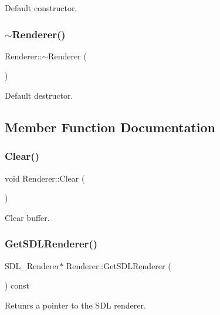 Default constructor. \mbox{\label{class_renderer_afeee408862d5bd6255a6882d47e6d5cd}} 
\subsubsection{\texorpdfstring{$\sim$\+Renderer()}{~Renderer()}}
{\footnotesize\ttfamily Renderer\+::$\sim$\+Renderer (\begin{DoxyParamCaption}{ }\end{DoxyParamCaption})}

Default destructor. 

\subsection{Member Function Documentation}
\mbox{\label{class_renderer_aeedbc2ffdccf51fa1384100446488746}} 
\subsubsection{\texorpdfstring{Clear()}{Clear()}}
{\footnotesize\ttfamily void Renderer\+::\+Clear (\begin{DoxyParamCaption}{ }\end{DoxyParamCaption})}

Clear buffer. \mbox{\label{class_renderer_a10f0554599d4fde891984d41d0e45c05}} 
\subsubsection{\texorpdfstring{Get\+S\+D\+L\+Renderer()}{GetSDLRenderer()}}
{\footnotesize\ttfamily S\+D\+L\+\_\+\+Renderer$\ast$ Renderer\+::\+Get\+S\+D\+L\+Renderer (\begin{DoxyParamCaption}{ }\end{DoxyParamCaption}) const\hspace{0.3cm}{\ttfamily [inline]}}

Retunrs a pointer to the S\+DL renderer. \mbox{\label{class_renderer_aa3d40d03451dab486e098b8f337c0f87}} 
